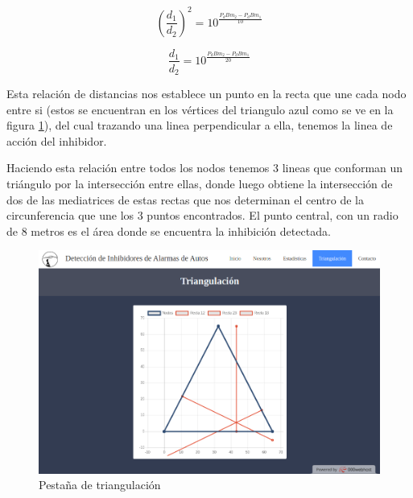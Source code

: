  \begin{equation}
    \left(\frac{d_1}{d_2}\right)^{2} = 10^{\frac{P_dBm_2 - P_dBm_1}{10}}
\end{equation}

 \begin{equation}\label{eq:triangulacion}
    \frac{d_1}{d_2} = 10^{\frac{P_dBm_2 - P_dBm_1}{20}}
\end{equation}

\par Esta relación de distancias nos establece un punto en la recta que une cada nodo entre si (estos se encuentran en los vértices del triangulo azul como se 
ve en la figura \ref{web_triangulacion}), del cual trazando una linea perpendicular a ella, tenemos la linea de acción del inhibidor.
\par Haciendo esta relación entre todos los nodos tenemos 3 lineas que conforman un triángulo por la intersección entre ellas, donde luego obtiene la 
intersección de dos de las mediatrices de estas rectas que nos determinan el centro de la circunferencia que une los 3 puntos encontrados. El punto central, 
con un radio de 8 metros es el área donde se encuentra la inhibición detectada. 


\begin{figure}[h!]
	\centering
	\includegraphics[scale=0.35]{images/web/triangulacion-web.png}
    \caption{Pestaña de triangulación}
	\label{web_triangulacion}
\end{figure}
